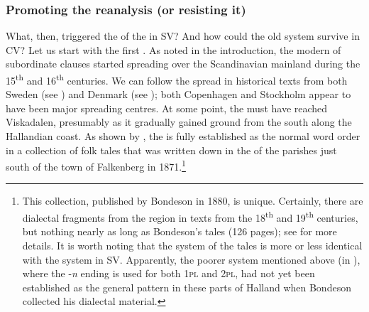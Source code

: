 \documentclass[output=paper,colorlinks,citecolor=brown,draft,draftmode]{langscibook}
\begin{document}
\subsubsection{Promoting the reanalysis (or resisting it)}\label{sec:petzell:4.3.3}\largerpage[1.5]


What, then, triggered the  of the  in SV? And how could the old system survive in CV? Let us start with the first . As noted in the introduction, the modern  of subordinate clauses started spreading over the Scandinavian mainland during the 15\textsuperscript{th} and 16\textsuperscript{th} centuries. We can follow the spread in historical texts from both Sweden (see \citealt{Falk1993}) and Denmark (see \citealt{Sundquist2003}); both Copenhagen and Stockholm appear to have been major spreading centres. At some point, the  must have reached Viskadalen, presumably as it gradually gained ground from the south along the Hallandian coast. As shown by \citet{Petzell2018}, the  is fully established as the normal  word order in a collection of folk tales that was written down in the  of the parishes just south of the town of Falkenberg in 1871.\footnote{This collection, published by Bondeson in 1880, is unique. Certainly, there are dialectal fragments from the region in texts from the 18\textsuperscript{th} and 19\textsuperscript{th} centuries, but nothing nearly as long as Bondeson’s tales (126 pages); see \citet{Petzell2018} for more details. It is worth noting that the  system of the tales is more or less identical with the system in SV. Apparently, the poorer system mentioned above (in ), where the -\textit{n} ending is used for both 1\textsc{pl} and 2\textsc{pl}, had not yet been established as the general pattern in these parts of Halland when Bondeson collected his dialectal material.}
\end{document}
